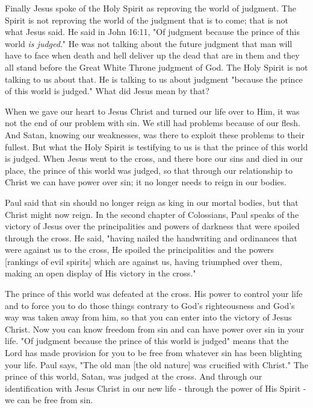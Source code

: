 Finally Jesus spoke of the Holy Spirit as reproving the world of judgment. The Spirit is not reproving the world of the judgment that is to come; that is not what Jesus said. He said in John 16:11, "Of judgment because the prince of this world \emph{is judged}." He was not talking about the future judgment that man will have to face when death and hell deliver up the dead that are in them and they all stand before the Great White Throne judgment of God. The Holy Spirit is not talking to us about that. He is talking to us about judgment "because the prince of this world is judged." What did Jesus mean by that? 

When we gave our heart to Jesus Christ and turned our life over to Him, it was not the end of our problem with sin. We still had problems because of our flesh. And Satan, knowing our weaknesses, was there to exploit these problems to their fullest. But what the Holy Spirit is testifying to us is that the prince of this world is judged. When Jesus went to the cross, and there bore our sins and died in our place, the prince of this world was judged, so that through our relationship to Christ we can have power over sin; it no longer needs to reign in our bodies. 

Paul said that sin should no longer reign as king in our mortal bodies, but that Christ might now reign. In the second chapter of Colossians, Paul speaks of the victory of Jesus over the principalities and powers of darkness that were spoiled through the cross. He said, "having nailed the handwriting and ordinances that were against us to the cross, He spoiled the principalities and the powers [rankings of evil spirits] which are against us, having triumphed over them, making an open display of His victory in the cross." 

The prince of this world was defeated at the cross. His power to control your life and to force you to do those things contrary to God's righteousness and God's way was taken away from him, so that you can enter into the victory of Jesus Christ. Now you can know freedom from sin and can have power over sin in your life. "Of judgment because the prince of this world is judged" means that the Lord has made provision for you to be free from whatever sin has been blighting your life. Paul says, "The old man [the old nature] was crucified with Christ." The prince of this world, Satan, was judged at the cross. And through our identification with Jesus Christ in our new life - through the power of His Spirit - we can be free from sin. 

